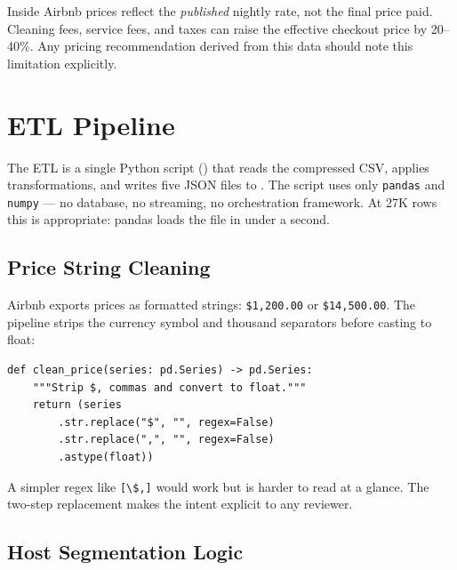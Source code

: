 \begin{keyinsight}
  Inside Airbnb prices reflect the \emph{published} nightly rate, not the final
  price paid. Cleaning fees, service fees, and taxes can raise the effective
  checkout price by 20–40\%. Any pricing recommendation derived from this data
  should note this limitation explicitly.
\end{keyinsight}

\section{ETL Pipeline}
\label{sec:airbnb-etl}


The ETL is a single Python script () that reads the
compressed CSV, applies transformations, and writes five JSON files to
. The script uses only \texttt{pandas} and
\texttt{numpy} — no database, no streaming, no orchestration framework. At 27K
rows this is appropriate: pandas loads the file in under a second.

\subsection{Price String Cleaning}

Airbnb exports prices as formatted strings: \texttt{\$1,200.00} or
\texttt{\$14,500.00}. The pipeline strips the currency symbol and thousand
separators before casting to float:

\begin{lstlisting}[style=python, caption={Price cleaning in \filepath{airbnb\_etl.py} (lines 18--20)}]
def clean_price(series: pd.Series) -> pd.Series:
    """Strip $, commas and convert to float."""
    return (series
        .str.replace("$", "", regex=False)
        .str.replace(",", "", regex=False)
        .astype(float))
\end{lstlisting}

A simpler regex like \texttt{[\textbackslash\$,]} would work but is harder to read
at a glance. The two-step replacement makes the intent explicit to any reviewer.

\subsection{Host Segmentation Logic}

